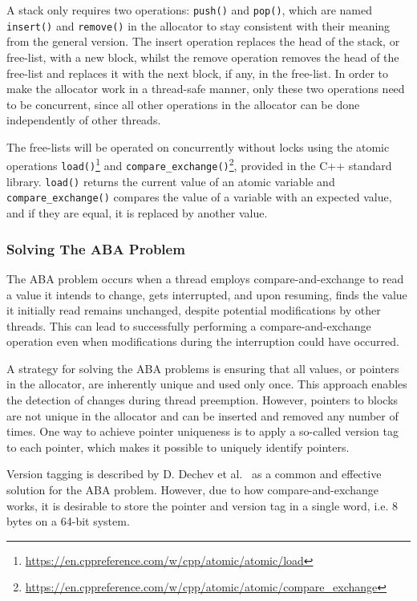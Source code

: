 A stack only requires two operations: \texttt{push()} and \texttt{pop()}, which are named \texttt{insert()} and \texttt{remove()} in the allocator to stay consistent with their meaning from the general version. The insert operation replaces the head of the stack, or free-list, with a new block, whilst the remove operation removes the head of the free-list and replaces it with the next block, if any, in the free-list. In order to make the allocator work in a thread-safe manner, only these two operations need to be concurrent, since all other operations in the allocator can be done independently of other threads.

The free-lists will be operated on concurrently without locks using the atomic operations \texttt{load()}\footnote{\url{https://en.cppreference.com/w/cpp/atomic/atomic/load}} and \texttt{compare\_exchange()}\footnote{\url{https://en.cppreference.com/w/cpp/atomic/atomic/compare_exchange}}, provided in the C++ standard library. \texttt{load()} returns the current value of an atomic variable and \texttt{compare\_exchange()} compares the value of a variable with an expected value, and if they are equal, it is replaced by another value.

\subsubsection{Solving The ABA Problem}
\label{sec:adaptations_impl:aba_problem}

The ABA problem occurs when a thread employs compare-and-exchange to read a value it intends to change, gets interrupted, and upon resuming, finds the value it initially read remains unchanged, despite potential modifications by other threads. This can lead to successfully performing a compare-and-exchange operation even when modifications during the interruption could have occurred.

A strategy for solving the ABA problems is ensuring that all values, or pointers in the allocator, are inherently unique and used only once. This approach enables the detection of changes during thread preemption. However, pointers to blocks are not unique in the allocator and can be inserted and removed any number of times. One way to achieve pointer uniqueness is to apply a so-called version tag to each pointer, which makes it possible to uniquely identify pointers.

Version tagging is described by D. Dechev et al.~\cite{bjarne_aba} as a common and effective solution for the ABA problem. However, due to how compare-and-exchange works, it is desirable to store the pointer and version tag in a single word, i.e. 8 bytes on a 64-bit system. 

